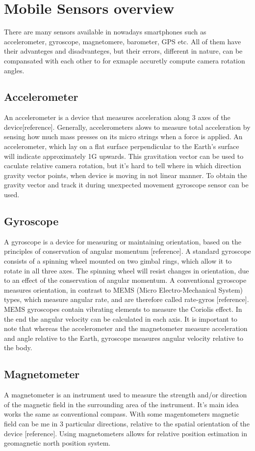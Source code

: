 \section{Mobile Sensors overview}
There are many sensors available in nowadays smartphones such as accelerometer, gyroscope, magnetomere, barometer, GPS etc. All of them have their advanteges and disadvanteges, but their errors, different in nature, can be compansated with each other to for exmaple accuretly compute camera rotation angles.
\subsection{Accelerometer}
An accelerometer is a device that measures acceleration along 3 axes of the device[reference]. Generally, accelerometers alows to measure total acceleration by sensing how much mass presses on its micro strings when a force is applied. An accelerometer, which lay on a flat surface perpendicular to the Earth's surface will indicate approximately 1G upwards. This gravitation vector can be used to caculate relative camera rotation, but it's hard to tell where in which direction gravity vector points, when device is moving in not linear manner. To obtain the gravity vector and track it during unexpected movement gyroscope sensor can be used.
\subsection{Gyroscope}
A gyroscope is a device for measuring or maintaining orientation, based on the principles of conservation of angular momentum [reference]. A standard gyroscope consists of a spinning wheel mounted on two gimbal rings, which allow it to rotate in all three axes. The spinning wheel will resist changes in orientation, due to an effect of the conservation of angular momentum. A conventional gyroscope measures orientation, in contrast to MEMS (Micro Electro-Mechanical System) types, which measure
angular rate, and are therefore called rate-gyros [reference]. MEMS gyroscopes contain vibrating elements to measure the Coriolis effect. In the end the angular velocity can be calculated in each axis. It is important to note that whereas the accelerometer and the magnetometer measure acceleration and angle relative to the Earth, gyroscope measures angular velocity
relative to the body.
\subsection{Magnetometer}
A magnetometer is an instrument used to measure the strength and/or direction of the magnetic field in the surrounding area of the instrument. It's main idea works the same as conventional compass. With some magentometers magnetic field can be me in 3 particular directions, relative to the spatial orientation of the device [reference]. Using magnetometers allows for relative position estimation in geomagnetic north position system. 
